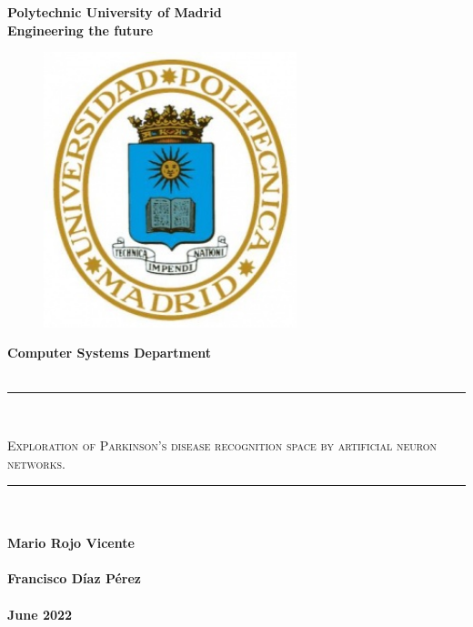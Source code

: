 \begin{titlepage}
	\begin{center}
		{\huge \textbf{Polytechnic University of Madrid}}\\
		\vspace{5mm}
		{\large \textbf{Engineering the future}}\\
		\vspace{5mm}
		\begin{figure}[h]
			\centering
			\includegraphics[height = 8cm]{img/insigneaUPM.jpg}
		\end{figure}
		\vspace{5mm}
		{\LARGE \textbf{Computer Systems Department}}\\
		\vspace{5mm}
		{\large {}}\\
		\vspace{5mm}
		\textcolor{RoyalBlue}{\rule{\linewidth}{0.75mm}}\\
		\vspace{2mm}
		\begin{spacing}{1.5} %
			{\LARGE \textsc{Exploration of Parkinson's disease recognition space by artificial neuron networks.}}
		\end{spacing}
		\textcolor{RoyalBlue}{\rule{\linewidth}{0.75mm}}\\
		\vspace{1cm}
		{\LARGE {}}\\
		\vspace{5mm}
		{\LARGE \textbf{Mario Rojo Vicente}}\\
		\vspace{5mm}
		{\LARGE {}}\\
		\vspace{5mm}
		{\LARGE \textbf{Francisco Díaz Pérez}}\\
		\vspace{5mm}
		{\Large {}}\\
		\vspace{5mm}
		{\Huge \textbf{June 2022}}
	\end{center}
\end{titlepage}